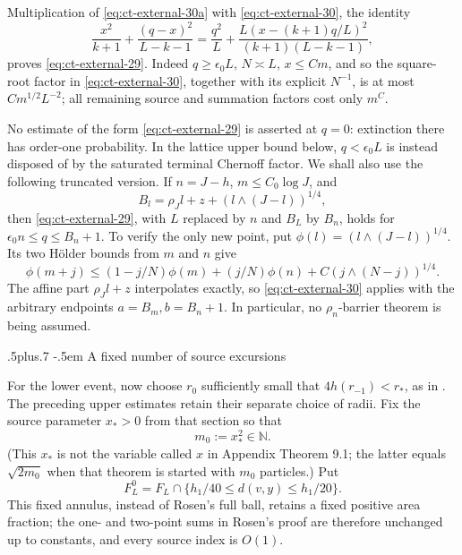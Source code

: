 \documentclass[12pt,reqno]{amsart}
\makeatletter
\def\subsubsection{\@startsection{subsubsection}{3}{0pt}%
  {.5\linespacing plus.7\linespacing}
  {-.5em}
  {\normalfont\itshape}}
\theoremstyle{plain}
\theoremstyle{definition}
\theoremstyle{remark}
\numberwithin{equation}{section}
\makeatother
\begin{document}
Multiplication of \eqref{eq:ct-external-30a} with \eqref{eq:ct-external-30}, the identity
\begin{equation}
\frac{x^2}{k+1}+\frac{(q-x)^2}{L-k-1}
 =\frac{q^2}{L}+
   \frac{L(x-(k+1)q/L)^2}{(k+1)(L-k-1)},\label{eq:ct-external-31}
\end{equation}
proves \eqref{eq:ct-external-29}.  Indeed $q\ge\epsilon_0L$, $N\asymp L$,
$x\le Cm$, and so the square-root factor in \eqref{eq:ct-external-30}, together with its
explicit $N^{-1}$, is at most $Cm^{1/2}L^{-2}$; all remaining source
and summation factors cost only $m^C$.

No estimate of the form \eqref{eq:ct-external-29} is asserted at $q=0$: extinction there
has order-one probability.  In the lattice upper bound below,
$q<\epsilon_0L$ is instead disposed of by the saturated terminal
Chernoff factor.  We shall also use the following truncated version.
If $n=J-h$, $m\le C_0\log J$, and
\[
B_l=\rho_Jl+z+(l\wedge(J-l))^{1/4},
\]
then \eqref{eq:ct-external-29}, with $L$ replaced by $n$ and $B_L$ by $B_n$, holds
for $\epsilon_0n\le q\le B_n+1$.  To verify the only new point, put
$\phi(l)=(l\wedge(J-l))^{1/4}$.  Its two Hölder bounds from $m$
and $n$ give
\begin{equation}
\phi(m+j)\le(1-j/N)\phi(m)+(j/N)\phi(n)
                 +C(j\wedge(N-j))^{1/4}.\label{eq:ct-external-31a}
\end{equation}
The affine part $\rho_Jl+z$ interpolates exactly, so \eqref{eq:ct-external-30} applies with
the arbitrary endpoints $a=B_m,b=B_n+1$.  In particular, no
$\rho_n$-barrier theorem is being assumed.

\subsubsection{A fixed number of source excursions}

For the lower event, now choose $r_0$ sufficiently small that
$4h(r_{-1})<r_*$, as in \cite[Section~3]{Rosen2022}.  The preceding
upper estimates retain their separate choice of radii.  Fix the source
parameter $x_*>0$ from that section so that
\begin{equation}
m_0:=x_*^2\in\mathbb N.\label{eq:ct-external-32a}
\end{equation}
(This $x_*$ is not the variable called $x$ in Appendix Theorem 9.1;
the latter equals $\sqrt{2m_0}$ when that theorem is started with
$m_0$ particles.)  Put
\[
F_L^0=F_L\cap\{h_1/40\le d(v,y)\le h_1/20\}.
\]
This fixed annulus, instead of Rosen's full ball, retains a fixed
positive area fraction; the one- and two-point sums in Rosen's proof are
therefore unchanged up to constants, and every source index is $O(1)$.
\end{document}
